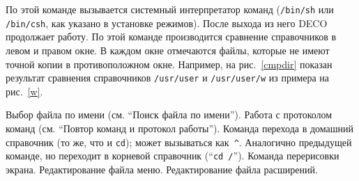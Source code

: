 \begin{example}
По этой команде вызывается системный интерпретатор команд ({\tt /bin/sh} или
{\tt /bin/csh}, как указано в установке режимов).
После выхода из него DECO продолжает работу.
По этой команде производится сравнение справочников в левом и правом
окне. В каждом окне отмечаются файлы, которые не имеют точной копии в
противоположном окне.
Например, на рис.~\ref{cmpdir} показан результат сравнения
справочников {\tt /usr/user} и {\tt /usr/user/w} из примера на рис.~\ref{w}.


Выбор файла по имени (см. ``Поиск файла по имени'').
Работа с протоколом команд (см. ``Повтор команд и протокол работы'').
\litem{Home directory~--- {\tt \^{}{[}}}
Команда перехода в домашний справочник (то же, что и {\tt cd}); может
вызываться как~{\tt \^{}\bs}.
Аналогично предыдущей команде, но переходит в корневой
справочник (``{\tt cd /}'').
\litem{Redraw screen~--- {\tt \^{}{]}}}
Команда перерисовки экрана.
Редактирование файла меню.
Редактирование файла расширений.
\end{example}


